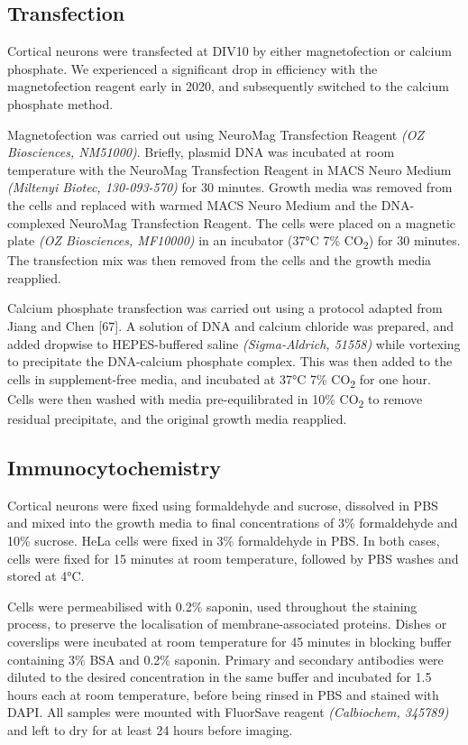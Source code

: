 \documentclass[
  12pt,
  a4paper,
]{book}
\begin{document}
\hypertarget{transfection}{%
\subsection{Transfection}\label{transfection}}

Cortical neurons were transfected at DIV10 by either magnetofection or calcium phosphate. We experienced a significant drop in efficiency with the magnetofection reagent early in 2020, and subsequently switched to the calcium phosphate method.

Magnetofection was carried out using NeuroMag Transfection Reagent \emph{(OZ Biosciences, NM51000)}. Briefly, plasmid DNA was incubated at room temperature with the NeuroMag Transfection Reagent in MACS Neuro Medium \emph{(Miltenyi Biotec, 130-093-570)} for 30 minutes. Growth media was removed from the cells and replaced with warmed MACS Neuro Medium and the DNA-complexed NeuroMag Transfection Reagent. The cells were placed on a magnetic plate \emph{(OZ Biosciences, MF10000)} in an incubator (37°C 7\% CO\textsubscript{2}) for 30 minutes. The transfection mix was then removed from the cells and the growth media reapplied.

Calcium phosphate transfection was carried out using a protocol adapted from Jiang and Chen {[}67{]}. A solution of DNA and calcium chloride was prepared, and added dropwise to HEPES-buffered saline \emph{(Sigma-Aldrich, 51558)} while vortexing to precipitate the DNA-calcium phosphate complex. This was then added to the cells in supplement-free media, and incubated at 37°C 7\% CO\textsubscript{2} for one hour. Cells were then washed with media pre-equilibrated in 10\% CO\textsubscript{2} to remove residual precipitate, and the original growth media reapplied.

\hypertarget{immuno}{%
\subsection{Immunocytochemistry}\label{immuno}}

Cortical neurons were fixed using formaldehyde and sucrose, dissolved in PBS and mixed into the growth media to final concentrations of 3\% formaldehyde and 10\% sucrose. HeLa cells were fixed in 3\% formaldehyde in PBS. In both cases, cells were fixed for 15 minutes at room temperature, followed by PBS washes and stored at 4°C.

Cells were permeabilised with 0.2\% saponin, used throughout the staining process, to preserve the localisation of membrane-associated proteins. Dishes or coverslips were incubated at room temperature for 45 minutes in blocking buffer containing 3\% BSA and 0.2\% saponin. Primary and secondary antibodies were diluted to the desired concentration in the same buffer and incubated for 1.5 hours each at room temperature, before being rinsed in PBS and stained with DAPI. All samples were mounted with FluorSave reagent \emph{(Calbiochem, 345789)} and left to dry for at least 24 hours before imaging.
\end{document}
